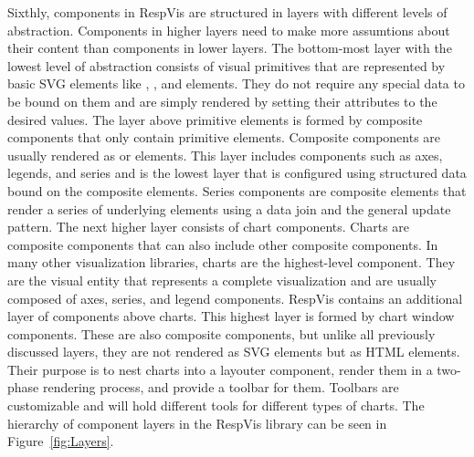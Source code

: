 Sixthly, components in RespVis are structured in layers with different levels of abstraction.
Components in higher layers need to make more assumtions about their content than components in lower layers.
The bottom-most layer with the lowest level of abstraction consists of visual primitives that are represented by basic SVG elements like , , and  elements.
They do not require any special data to be bound on them and are simply rendered by setting their attributes to the desired values.
The layer above primitive elements is formed by composite components that only contain primitive elements.
Composite components are usually rendered as  or  elements.
This layer includes components such as axes, legends, and series and is the lowest layer that is configured using structured data bound on the composite elements.
Series components are composite elements that render a series of underlying elements using a data join and the general update pattern.
The next higher layer consists of chart components.
Charts are composite components that can also include other composite components. 
In many other visualization libraries, charts are the highest-level component.
They are the visual entity that represents a complete visualization and are usually composed of axes, series, and legend components.
RespVis contains an additional layer of components above charts.
This highest layer is formed by chart window components.
These are also composite components, but unlike all previously discussed layers, they are not rendered as SVG elements but as HTML  elements.
Their purpose is to nest charts into a layouter component, render them in a two-phase rendering process, and provide a toolbar for them.
Toolbars are customizable and will hold different tools for different types of charts.
The hierarchy of component layers in the RespVis library can be seen in Figure~\ref{fig:Layers}. 


